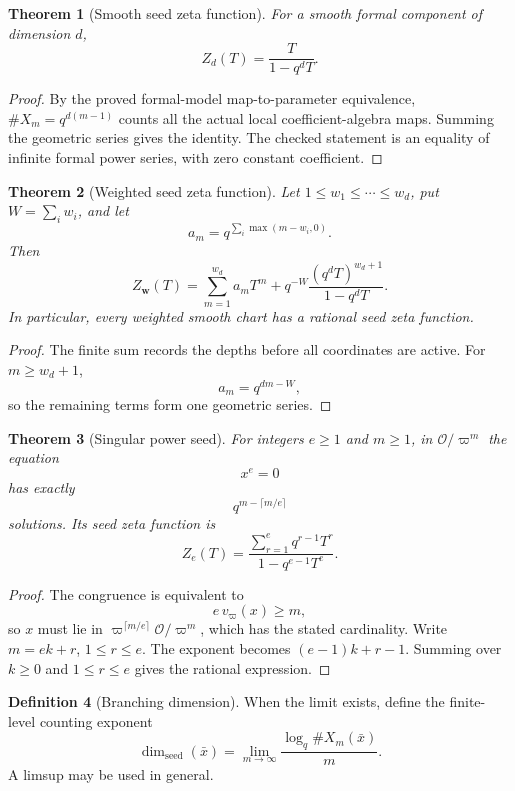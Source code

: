 \documentclass[11pt]{article}
\newtheorem{theorem}{Theorem}[section]
\theoremstyle{definition}
\newtheorem{definition}[theorem]{Definition}
\theoremstyle{remark}
\newcommand{\Ocal}{\mathcal O}
\begin{document}
\begin{theorem}[Smooth seed zeta function]\label{px:6.2}
For a smooth formal component of dimension \(d\),
\[
\boxed{
Z_d(T)=\frac{T}{1-q^dT}.
}
\]
\end{theorem}

\begin{proof}
By the proved formal-model map-to-parameter equivalence, \(\#X_m=q^{d(m-1)}\) counts all the actual local coefficient-algebra maps. Summing the geometric series gives the identity. The checked statement is an equality of infinite formal power series, with zero constant coefficient.
\end{proof}

\begin{theorem}[Weighted seed zeta function]\label{px:6.3}
Let \(1\le w_1\le\cdots\le w_d\), put \(W=\sum_iw_i\), and let
\[
a_m=q^{\sum_i\max(m-w_i,0)}.
\]
Then
\[
\boxed{
Z_{\bm w}(T)
=
\sum_{m=1}^{w_d}a_mT^m
+
q^{-W}\frac{(q^dT)^{w_d+1}}{1-q^dT}.
}
\]
In particular, every weighted smooth chart has a rational seed zeta function.
\end{theorem}

\begin{proof}
The finite sum records the depths before all coordinates are active.  For \(m\ge w_d+1\),
\[
a_m=q^{dm-W},
\]
so the remaining terms form one geometric series.
\end{proof}

\begin{theorem}[Singular power seed]\label{px:6.4}
For integers \(e\ge1\) and \(m\ge1\), in \(\Ocal/\varpi^m\) the equation
\[
x^e=0
\]
has exactly
\[
\boxed{
q^{m-\lceil m/e\rceil}
}
\]
solutions.  Its seed zeta function is
\[
\boxed{
Z_e(T)
=
\frac{\sum_{r=1}^{e}q^{r-1}T^r}
{1-q^{e-1}T^e}.
}
\]
\end{theorem}

\begin{proof}
The congruence is equivalent to
\[
e\,v_\varpi(x)\ge m,
\]
so \(x\) must lie in \(\varpi^{\lceil m/e\rceil}\Ocal/\varpi^m\), which has the stated cardinality.  Write \(m=ek+r\), \(1\le r\le e\).  The exponent becomes \((e-1)k+r-1\).  Summing over \(k\ge0\) and \(1\le r\le e\) gives the rational expression.
\end{proof}

\begin{definition}[Branching dimension]\label{px:6.5}
When the limit exists, define the finite-level counting exponent
\[
\dim_{\mathrm{seed}}(\bar x)
=
\lim_{m\to\infty}
\frac{\log_q\#X_m(\bar x)}{m}.
\]
A limsup may be used in general.
\end{definition}
\end{document}

